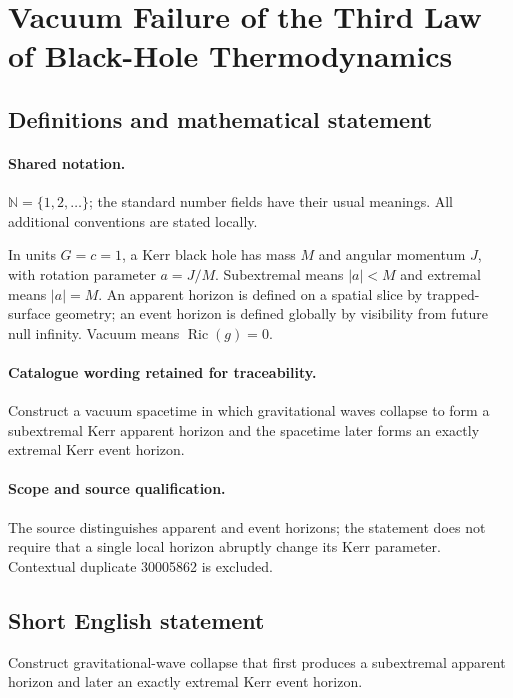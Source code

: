 \documentclass[11pt]{article}
\begin{document}
\section{Vacuum Failure of the Third Law of Black-Hole Thermodynamics}\label{statement}

\subsection{Definitions and mathematical statement}

\paragraph{Shared notation.}$\mathbb N=\{1,2,\ldots\}$; the standard number fields have their usual meanings. All additional conventions are stated locally.


In units $G=c=1$, a Kerr black hole has mass $M$ and angular momentum $J$, with rotation parameter $a=J/M$. Subextremal means $|a|<M$ and extremal means $|a|=M$. An apparent horizon is defined on a spatial slice by trapped-surface geometry; an event horizon is defined globally by visibility from future null infinity. Vacuum means $\operatorname{Ric}(g)=0$.

\paragraph{Catalogue wording retained for traceability.}
Construct a vacuum spacetime in which gravitational waves collapse to form a subextremal Kerr apparent horizon and the spacetime later forms an exactly extremal Kerr event horizon.

\paragraph{Scope and source qualification.}The source distinguishes apparent and event horizons; the statement does not require that a single local horizon abruptly change its Kerr parameter. Contextual duplicate 30005862 is excluded.
\subsection{Short English statement}
Construct gravitational-wave collapse that first produces a subextremal apparent horizon and later an exactly extremal Kerr event horizon.
\end{document}
